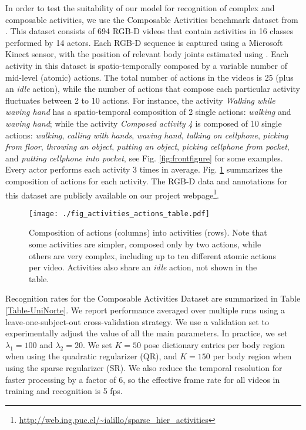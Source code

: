 In order to test the suitability of our model for recognition of complex and
composable activities, we use
the Composable Activities benchmark dataset from \cite{Lillo2014}.
This dataset consists of 694 RGB-D
videos that contain activities in 16 classes performed by 14 actors. Each
RGB-D sequence is captured using a Microsoft Kinect sensor, with the
position of relevant body joints estimated using \cite{Microsoft2012}.
Each activity in this dataset is spatio-temporally
composed by a variable number of mid-level (atomic) actions. The total number of
actions in the videos is 25 (plus an \emph{idle} action), while the number of actions
that compose each particular activity fluctuates between 2 to 10 actions.
For instance, the activity \emph{Walking while waving hand} has a spatio-temporal
composition of 2 single actions: \emph{walking} and \emph{waving hand};
while the activity \emph{Composed activity 4} is composed of 10 single actions:
 \emph{walking}, \emph{calling with hands}, \emph{waving hand},
\emph{talking on cellphone}, \emph{picking from floor}, \emph{throwing an object},
\emph{putting an object}, \emph{picking cellphone from pocket}, and \emph{putting
cellphone into pocket}, see Fig. \ref{fig:frontfigure} for some examples.
Every actor performs each activity 3 times in average.
Fig. \ref{fig_activities_actions_table} summarizes the composition of actions for
each activity.
The RGB-D data and annotations for this dataset are publicly available on
our project webpage\footnote{\url{http://web.ing.puc.cl/~ialillo/sparse_hier_activities}}.
%
\begin{figure}[tb]
\begin{center}
\texttt{[image: ./fig\_activities\_actions\_table.pdf]}
\end{center}
\caption{Composition of actions (columns) into activities (rows). Note that some activities are simpler, composed only by two actions, while others are very complex, including up to ten different atomic actions per video. Activities also share an \emph{idle} action, not shown in the table.}
\label{fig_activities_actions_table}
\end{figure}
%

Recognition rates for the Composable Activities Dataset are summarized in Table
\ref{Table-UniNorte}. 
We report performance averaged over multiple runs
using a leave-one-subject-out cross-validation strategy.
We use a validation set to experimentally adjust the value of all the main
parameters.
In practice, we set $\lambda_1 = 100$ and $\lambda_2 = 20$.
We set $K=50$ pose dictionary entries per body region when using the quadratic
regularizer (QR), and $K=150$ per body region when using the sparse
regularizer (SR).
We also reduce the temporal resolution for faster processing by
a factor of 6,
so the effective frame rate for all videos in training and recognition is 5 fps.

